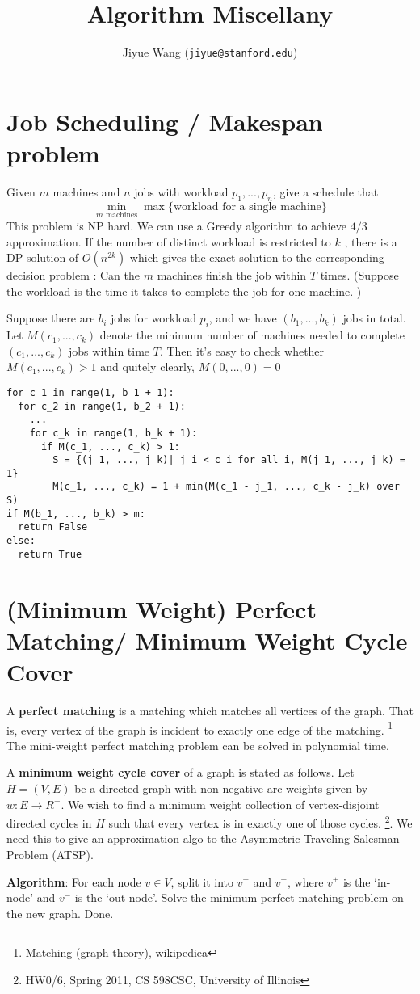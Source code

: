 \documentclass[12pt]{article}
\title{Algorithm Miscellany}
\author{Jiyue Wang (\texttt{jiyue@stanford.edu})}
\begin{document}
\maketitle

\section{Job Scheduling / Makespan problem}
Given $m$ machines and $n$ jobs with workload $p_1, ..., p_n$, give a schedule that 
\[
  \min_{\text{$m$ machines}} \max \{ \text{workload for a single machine}\}
\]
This problem is NP hard. We can use a Greedy algorithm to achieve $4/3$ approximation. If the number of distinct workload is restricted to $k$ , there is a DP solution of $O(n^{2k})$ which gives the exact solution to the corresponding decision problem : Can the $m$ machines finish the job within $T$ times. (Suppose the workload is the time it takes to complete the job for one machine. )

Suppose there are $b_i$ jobs for workload $p_i$, and we have $(b_1, ..., b_k)$ jobs in total. Let $M(c_1, ..., c_k)$ denote the minimum number of machines needed to complete $(c_1, ..., c_k)$ jobs within time $T$. Then it's easy to check whether $M(c_1, ..., c_k) > 1$ and quitely clearly, $M(0, ..., 0) = 0$

\begin{lstlisting}[frame=single]
for c_1 in range(1, b_1 + 1):
  for c_2 in range(1, b_2 + 1):
    ...
    for c_k in range(1, b_k + 1):
      if M(c_1, ..., c_k) > 1:
        S = {(j_1, ..., j_k)| j_i < c_i for all i, M(j_1, ..., j_k) = 1}
        M(c_1, ..., c_k) = 1 + min(M(c_1 - j_1, ..., c_k - j_k) over S)
if M(b_1, ..., b_k) > m:
  return False
else:
  return True
\end{lstlisting}

\section{(Minimum Weight) Perfect Matching/ Minimum Weight Cycle Cover}
A \textbf{perfect matching} is a matching which matches all vertices of the graph. That is, every vertex of the graph is incident to exactly one edge of the matching. \footnote{Matching (graph theory), wikipediea} The mini-weight perfect matching problem can be solved in polynomial time. 

A \textbf{minimum weight cycle cover} of a graph is stated as follows. Let $H = (V, E)$ be a directed graph with non-negative arc weights given by $w: E \rightarrow R ^+$. We wish to find a minimum weight collection of vertex-disjoint directed cycles in $H$ such that every vertex is in exactly one of those cycles. \footnote{HW0/6, Spring 2011, CS 598CSC, University of Illinois}. We need this to give an approximation algo to the Asymmetric Traveling Salesman Problem (ATSP).

\textbf{Algorithm}:
For each node $v \in V$, split it into $v^+$ and $v^-$, where $v^+$ is the `in-node' and $v^-$ is the `out-node'. Solve the minimum perfect matching problem on the new graph. Done.
\end{document}
